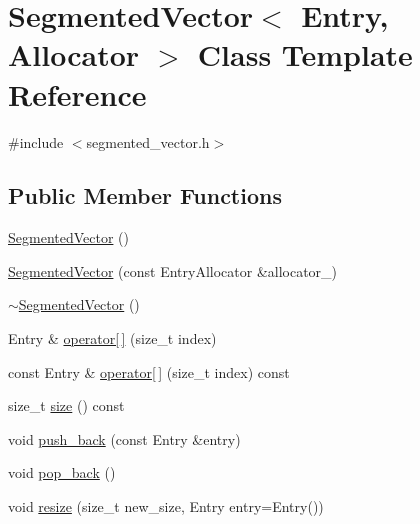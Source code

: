\hypertarget{classSegmentedVector}{\section{Segmented\-Vector$<$ Entry, Allocator $>$ Class Template Reference}
\label{classSegmentedVector}
}


{\ttfamily \#include $<$segmented\-\_\-vector.\-h$>$}

\subsection*{Public Member Functions}
\begin{DoxyCompactItemize}
\item 
\hyperlink{classSegmentedVector_a5dcb317e685d3d6dfa85fb3afe524e27}{Segmented\-Vector} ()
\item 
\hyperlink{classSegmentedVector_ac277a452558e58ca4c749f180e370e96}{Segmented\-Vector} (const Entry\-Allocator \&allocator\-\_\-)
\item 
\hyperlink{classSegmentedVector_af9dadab6ba69124409b6bd40b52006c7}{$\sim$\-Segmented\-Vector} ()
\item 
Entry \& \hyperlink{classSegmentedVector_a91fbfa8f636ac4e4fb7d022e9fc1956c}{operator\mbox{[}$\,$\mbox{]}} (size\-\_\-t index)
\item 
const Entry \& \hyperlink{classSegmentedVector_a43999003970d4f5b20a097d673450113}{operator\mbox{[}$\,$\mbox{]}} (size\-\_\-t index) const 
\item 
size\-\_\-t \hyperlink{classSegmentedVector_a6a139b65c0fa335bfb29e24d260cf9b7}{size} () const 
\item 
void \hyperlink{classSegmentedVector_a7a2e9ebc35d160b15f0bcf216d9d8294}{push\-\_\-back} (const Entry \&entry)
\item 
void \hyperlink{classSegmentedVector_a0eb950e61f11965108d15a6e0ad74f7a}{pop\-\_\-back} ()
\item 
void \hyperlink{classSegmentedVector_accc8146ae999650ca6cd8826bec6f8a5}{resize} (size\-\_\-t new\-\_\-size, Entry entry=Entry())
\end{DoxyCompactItemize}


